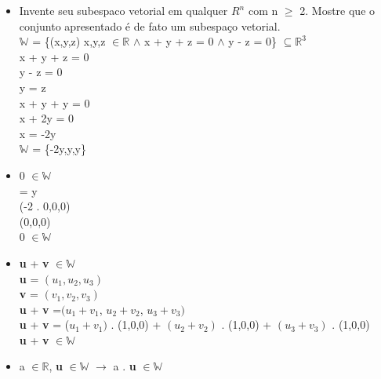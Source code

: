 \documentclass{article}
\begin{document}
\newline
\begin{itemize}



\newpage    
\item Invente seu subespaco vetorial em qualquer $R^n$ com n $\ge$ 2. Mostre que o conjunto apresentado é de fato um subespaço vetorial.\\
\newline
$\mathbb{W}$ = \{(x,y,z) x,y,z $\in \mathbb{R}$ $\land$ x + y + z = 0 $\land$ y - z = 0\} $\subseteq \mathbb{R}^3$\\
\newline
x + y + z = 0\\
\newline
y - z = 0\\
y = z\\
\newline
x + y + y = 0\\
x + 2y = 0\\
x = -2y\\
\newline
$\mathbb{W}$ = \{-2y,y,y\}\\
\newline
    \item 0 $\in\mathbb{W}$\\
 = y\\
(-2 . 0,0,0)\\
(0,0,0)\\
0 $\in\mathbb{W}$\\
\newline
    \item \textbf{u} + \textbf{v} $\in \mathbb{W}$\\
\newline
\textbf{u} = $(u_{1}, u_{2}, u_{3})$\\ 
\textbf{v} = $(v_{1}, v_{2}, v_{3})$\\
\newline
\textbf{u} +  \textbf{v} =$(u_{1} + v_{1}$, $u_{2} + v_{2}$, $u_{3} + v_{3})$ \\
\textbf{u} +  \textbf{v} = ($u_{1} + v_{1})$ . (1,0,0) + $(u_{2} + v_{2})$ . (1,0,0) + $(u_{3} + v_{3})$ . (1,0,0) \\
\newline
\textbf{u} +  \textbf{v} $\in \mathbb{W}$\\
\newline
    \item a $\in \mathbb{R}$, \textbf{u} $\in \mathbb{W}$ $\to$ a . \textbf{u} $\in \mathbb{W}$\\

\end{itemize}
\end{document}
